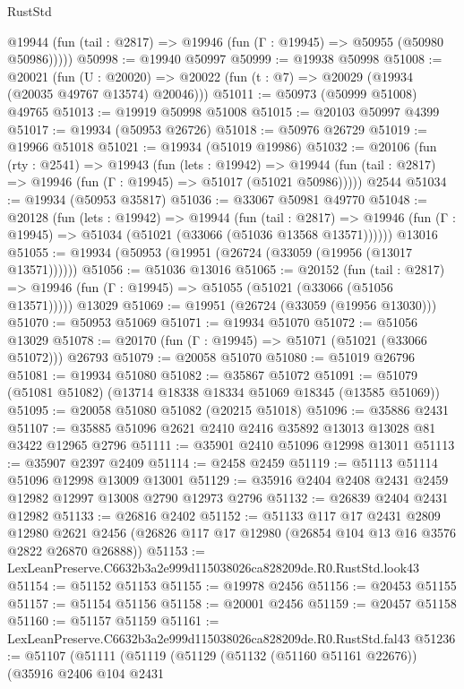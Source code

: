 \begin{lexlean}{RustStd}
\begin{coremodule}
      @19944 (fun (tail : @2817) => @19946 (fun (Γ : @19945) => @50955 (@50980 @50986)))))
@50998 := @19940 @50997
@50999 := @19938 @50998
@51008 := @20021
    (fun (U : @20020) => @20022 (fun (t : @7) => @20029 (@19934 (@20035 @49767 @13574) @20046)))
@51011 := @50973 (@50999 @51008) @49765
@51013 := @19919 @50998 @51008
@51015 := @20103 @50997 @4399
@51017 := @19934 (@50953 @26726)
@51018 := @50976 @26729
@51019 := @19966 @51018
@51021 := @19934 (@51019 @19986)
@51032 := @20106
    (fun (rty : @2541) =>
    @19943
      (fun (lets : @19942) =>
      @19944 (fun (tail : @2817) => @19946 (fun (Γ : @19945) => @51017 (@51021 @50986)))))
    @2544
@51034 := @19934 (@50953 @35817)
@51036 := @33067 @50981 @49770
@51048 := @20128
    (fun (lets : @19942) =>
    @19944
      (fun (tail : @2817) =>
      @19946 (fun (Γ : @19945) => @51034 (@51021 (@33066 (@51036 @13568 @13571))))))
    @13016
@51055 := @19934 (@50953 (@19951 (@26724 (@33059 (@19956 (@13017 @13571))))))
@51056 := @51036 @13016
@51065 := @20152
    (fun (tail : @2817) => @19946 (fun (Γ : @19945) => @51055 (@51021 (@33066 (@51056 @13571)))))
    @13029
@51069 := @19951 (@26724 (@33059 (@19956 @13030)))
@51070 := @50953 @51069
@51071 := @19934 @51070
@51072 := @51056 @13029
@51078 := @20170 (fun (Γ : @19945) => @51071 (@51021 (@33066 @51072))) @26793
@51079 := @20058 @51070
@51080 := @51019 @26796
@51081 := @19934 @51080
@51082 := @35867 @51072
@51091 := @51079 (@51081 @51082) (@13714 @18338 @18334 @51069 @18345 (@13585 @51069))
@51095 := @20058 @51080 @51082 (@20215 @51018)
@51096 := @35886 @2431
@51107 := @35885 @51096 @2621 @2410 @2416 @35892 @13013 @13028 @81 @3422 @12965 @2796
@51111 := @35901 @2410 @51096 @12998 @13011
@51113 := @35907 @2397 @2409
@51114 := @2458 @2459
@51119 := @51113 @51114 @51096 @12998 @13009 @13001
@51129 := @35916 @2404 @2408 @2431 @2459 @12982 @12997 @13008 @2790 @12973 @2796
@51132 := @26839 @2404 @2431 @12982
@51133 := @26816 @2402
@51152 := @51133
    @117
    @17
    @2431
    @2809
    @12980
    @2621
    @2456
    (@26826 @117 @17 @12980 (@26854 @104 @13 @16 @3576 @2822 @26870 @26888))
@51153 := LexLeanPreserve.C6632b3a2e999d115038026ca828209de.R0.RustStd.look43
@51154 := @51152 @51153
@51155 := @19978 @2456
@51156 := @20453 @51155
@51157 := @51154 @51156
@51158 := @20001 @2456
@51159 := @20457 @51158
@51160 := @51157 @51159
@51161 := LexLeanPreserve.C6632b3a2e999d115038026ca828209de.R0.RustStd.fal43
@51236 := @51107
    (@51111
      (@51119
        (@51129
          (@51132 (@51160 @51161 @22676))
          (@35916
            @2406
            @104
            @2431

\end{coremodule}
\end{lexlean}
